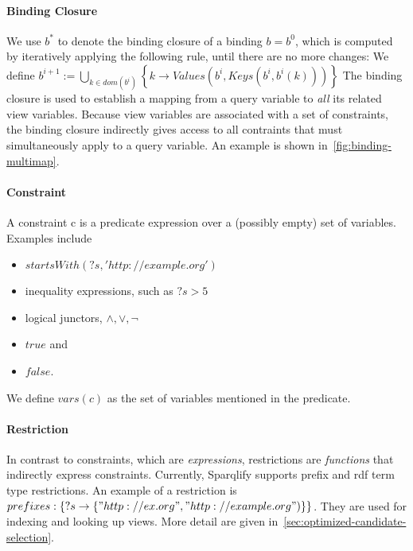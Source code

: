 \documentclass[a4paper,twoside,bibtotoc,abstracton,12pt,BCOR=15mm]{scrreprt}
\newcommand{\todo}[1]{\textbf{ToDo: \textit{#1}}}
\begin{document}
\paragraph{Binding Closure}
We use $b^*$ to denote the binding closure of a binding $b = b^0$, which is computed by
iteratively applying the following rule, until there are no more changes: We define $b^{i+1} := \bigcup_{k \in dom(b^i)} \left \{ k \rightarrow Values(b^i, Keys(b^i, b^i(k))) \right \}$
The binding closure is used to establish a mapping from a query variable to \emph{all} its related view variables.
Because view variables are associated with a set of constraints, the binding closure indirectly gives access to all contraints that must simultaneously apply to a query variable.
An example is shown in~\autoref{fig:binding-multimap}.

\paragraph{Constraint}
A constraint c is a predicate expression over a (possibly empty) set of variables.
Examples include
\begin{itemize}
\item $startsWith(?s, 'http://example.org')$
\item inequality expressions, such as $?s > 5$
\item logical junctors, $\wedge, \vee, \lnot$
\item $true$ and
\item $false$.
\end{itemize}
We define $vars(c)$ as the set of variables mentioned in the predicate.


\paragraph{Restriction}
In contrast to constraints, which are \emph{expressions}, restrictions are \emph{functions} that indirectly express constraints.
Currently, Sparqlify supports prefix and rdf term type restrictions.
An example of a restriction is $prefixes: \left \{ ?s \rightarrow \left \{ "http://ex.org", "http://example.org") \right \} \right \}$.
They are used for indexing and looking up views. More detail are given in~\autoref{sec:optimized-candidate-selection}.
 
\end{document}
